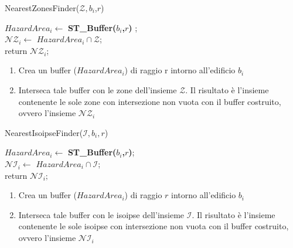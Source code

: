 \begin{algorithm}[H]
	
	\IncMargin{1em}
	\caption{NearestZonesFinder($\mathcal{Z},b_i$,$r$)}
	\label{alg:1}
	\BlankLine
	\SetAlgoNoLine
	$ HazardArea_i  \leftarrow $ \textbf{ST\_Buffer($b_i$,$r$)} ; \\ 
	$ \mathcal{NZ}_i  \leftarrow $ $HazardArea_i \cap \mathcal{Z}$; \\
	return $\mathcal{NZ}_i$;
	
\end{algorithm}

\begin{enumerate}
	\item Crea un buffer ($ HazardArea_i $) di raggio r intorno all'edificio $b_i$
	\item Interseca tale buffer con le zone dell’insieme $\mathcal{Z}$. Il risultato è l’insieme contenente le sole zone con intersezione non vuota con il buffer costruito, ovvero l’insieme  $\mathcal{NZ}_i$
\end{enumerate}

\begin{algorithm}[H]
	
	
	\IncMargin{1em}
	\caption{NearestIsoipseFinder($\mathcal{I},b_i,r$)}
	\label{alg:two}
	\BlankLine
	\SetAlgoNoLine
	$  HazardArea_i   \leftarrow $ \textbf{ST\_Buffer($b_i$,$r$)}; \\
	$ \mathcal{NI}_i \leftarrow $ $HazardArea_i \cap \mathcal{I} $; \\
	return $\mathcal{NI}_i;$
\end{algorithm}
\begin{enumerate}
	\item Crea un buffer ($ HazardArea_i $) di raggio $r$ intorno all'edificio $b_i$
	\item Interseca tale buffer con le isoipse dell’insieme $\mathcal{I}$. Il risultato è l’insieme contenente le sole isoipse con intersezione non vuota con il buffer costruito, ovvero l’insieme  $\mathcal{NI}_i$
\end{enumerate}

